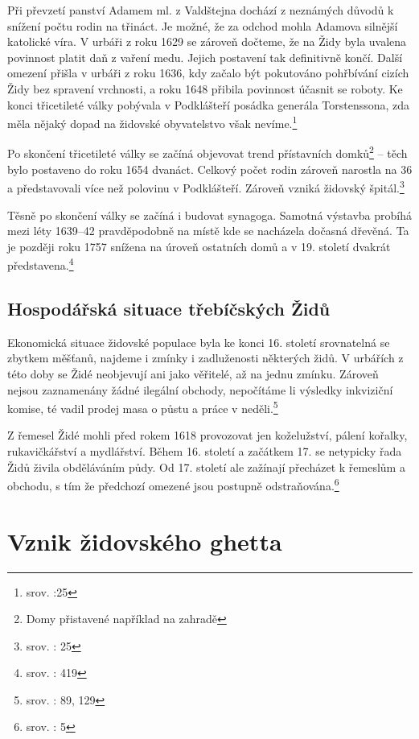 \documentclass[a4paper,oneside,12p]{report}
\begin{document}
Při převzetí panství Adamem ml. z Valdštejna dochází z neznámých důvodů k snížení počtu rodin na třináct.
Je možné, že za odchod mohla Adamova silnější katolické víra.
V urbáři z roku 1629 se zároveň dočteme, že na Židy byla uvalena povinnost platit daň z vaření medu.
Jejich  postavení tak definitivně končí.
Další omezení přišla v urbáři z roku 1636, kdy začalo být pokutováno pohřbívání cizích Židy bez spravení vrchnosti, a roku 1648 přibila povinnost účasnit se roboty.
Ke konci třicetileté války pobývala v Podklášteří posádka generála Torstenssona, zda měla nějaký dopad na židovské obyvatelstvo však nevíme.\footnote{srov. \cite{Fiser2005}:25}

Po skončení třicetileté války se začíná objevovat trend přístavních domků\footnote{Domy přistavené například na zahradě} -- těch bylo postaveno do roku 1654 dvanáct.
Celkový počet rodin zároveň narostla na 36 a představovali více než polovinu v Podklášteří.
Zároveň vzniká židovský špitál.\footnote{srov. \cite{Fiser2005}: 25}

Těsně po skončení války se začíná i budovat  synagoga.
Samotná výstavba probíhá mezi léty 1639--42 pravděpodobně na místě kde se nacházela dočasná dřevěná.
Ta je později roku 1757 snížena na úroveň ostatních domů a v 19. století dvakrát představena.\footnote{srov. \cite{Pekny2001}: 419}

\subsection{Hospodářská situace třebíčských Židů}

Ekonomická situace židovské populace byla ke konci 16. století srovnatelná se zbytkem měšťanů, najdeme i zmínky i zadluženosti některých židů.
V urbářích z této doby se Židé neobjevují ani jako věřitelé, až na jednu zmínku.
Zároveň nejsou zaznamenány žádné ilegální obchody, nepočítáme li výsledky inkviziční komise, té vadil prodej masa o půstu a práce v neděli.\footnote{srov. \cite{Uhlir1978}: 89, 129}

Z řemesel Židé mohli před rokem 1618 provozovat jen koželužství, pálení kořalky, rukavičkářství a mydlářství.
Během 16. století a začátkem 17. se netypicky řada Židů živila obděláváním půdy.
Od 17. století ale zažínají přecházet k řemeslům a obchodu, s tím že předchozí omezené jsou postupně odstraňována.\footnote{srov. \cite{Klenovsky2003}: 5}

\section{Vznik židovského ghetta}
\end{document}

